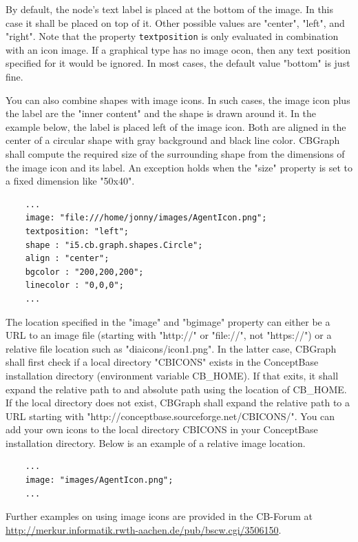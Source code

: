 By default, the node's text label is placed at the bottom of the image. In this
case it shall be placed on top of it. Other possible values are "center", "left",
and "right". Note that the property {\tt textposition} is only evaluated in combination
with an icon image. If a graphical type has no image ocon, then any text position
specified for it would be ignored.
In most cases, the default value "bottom" is just fine.

You can also combine shapes with image icons. In such cases, the image icon plus the
label are the "inner content" and the shape is drawn around it. In the example below,
the label is placed left of the image icon. Both are aligned in the center of a
circular shape with gray background and black line color. CBGraph shall compute the
required size of the surrounding shape from the dimensions of the image icon and its label. An exception
holds when the "size" property is set to a fixed dimension like "50x40".

{\small
\begin{verbatim}
    ...
    image: "file:///home/jonny/images/AgentIcon.png";
    textposition: "left";
    shape : "i5.cb.graph.shapes.Circle";
    align : "center";
    bgcolor : "200,200,200";
    linecolor : "0,0,0";
    ...
\end{verbatim}
}

The location specified in the "image" and "bgimage" property can either be a URL to an image file 
(starting with "http://" or "file://", not "https://") or a relative file location such as
"diaicons/icon1.png". In the latter case, CBGraph shall first check if a local
directory "CBICONS" exists in the ConceptBase installation directory (environment
variable CB\_HOME). If that exits, it shall expand the relative path to
and absolute path using the location of CB\_HOME.  If the local directory does
not exist, CBGraph shall expand the relative path to a URL starting with
"http://conceptbase.sourceforge.net/CBICONS/". 
You can add your own icons to the local directory CBICONS in your ConceptBase
installation directory. Below is an example of a relative image location.

{\small
\begin{verbatim}
    ...
    image: "images/AgentIcon.png";
    ...
\end{verbatim}
}


Further examples on using image icons are provided in the CB-Forum at
\url{http://merkur.informatik.rwth-aachen.de/pub/bscw.cgi/3506150}.


